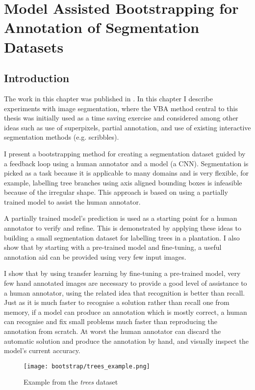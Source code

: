 \chapter{Model Assisted Bootstrapping for Annotation of Segmentation Datasets}
\label{chap:bootstrap} 
 
 
\section {Introduction}

The work in this chapter was published in \cite{Batchelorh}. In this chapter I describe experiments with image segmentation, where the \gls{VBA} method central to this thesis was initially used as a time saving exercise and considered among other ideas such as use of superpixels, partial annotation, and use of existing interactive segmentation methods (e.g. scribbles).

I present a bootstrapping method for creating a segmentation dataset guided by a feedback loop using a human annotator and a model (a \gls{CNN}). Segmentation is picked as a task because it is applicable to many domains and is very flexible, for example, labelling tree branches using axis aligned bounding boxes is infeasible because of the irregular shape. This approach is based on using a partially trained model to assist the human annotator.

 A partially trained model's prediction is used as a starting point for a human annotator to verify and refine. This is demonstrated by applying these ideas to building a small segmentation dataset for labelling trees in a plantation. I also show that by starting with a pre-trained model and fine-tuning, a useful annotation aid can be provided using very few input images.


I show that by using transfer learning by fine-tuning a pre-trained model, very few hand annotated images are necessary to provide a good level of assistance to a human annotator, using the related idea that recognition is better than recall. Just as it is much faster to recognise a solution rather than recall one from memory, if a model can produce an annotation which is mostly correct, a human can recognise and fix small problems much faster than reproducing the annotation from scratch. At worst the human annotator can discard the automatic solution and produce the annotation by hand, and visually inspect the model's current accuracy.

\begin{figure}[ht]
\centering
\texttt{[image: bootstrap/trees\_example.png]}

\caption{Example from the \emph{trees} dataset}
\label{fig:bootstrap_tree}
\end{figure}

